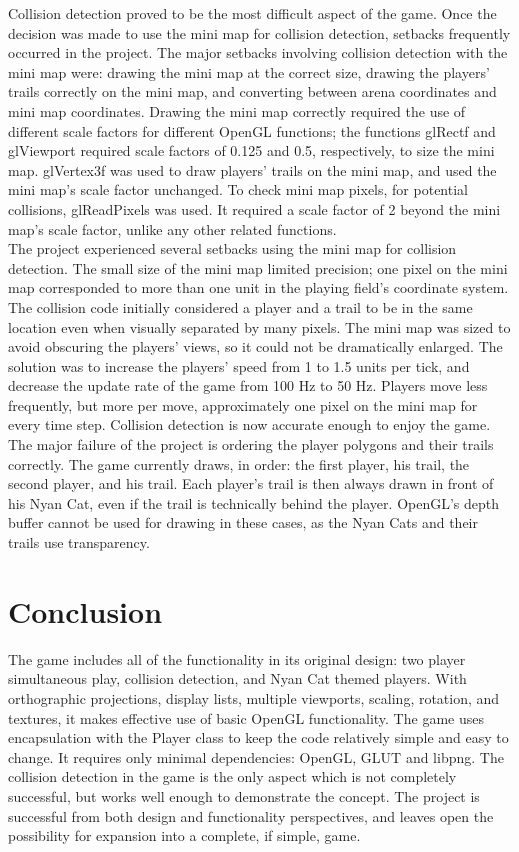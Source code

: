 \documentclass[12pt]{article}
\begin{document}
Collision detection proved to be the most difficult aspect of the game.  Once the decision was made to use the mini map for collision detection, setbacks frequently occurred in the project.  The major setbacks involving collision detection with the mini map were: drawing the mini map at the correct size, drawing the players' trails correctly on the mini map, and converting between arena coordinates and mini map coordinates.  Drawing the mini map correctly required the use of different scale factors for different OpenGL functions; the functions glRectf and glViewport required scale factors of 0.125 and 0.5, respectively, to size the mini map.  glVertex3f was used to draw players' trails on the mini map, and used the mini map's scale factor unchanged.  To check mini map pixels, for potential collisions, glReadPixels was used.  It required a scale factor of 2 beyond the mini map's scale factor, unlike any other related functions.\\

The project experienced several setbacks using the mini map for collision detection.  The small size of the mini map limited precision; one pixel on the mini map corresponded to more than one unit in the playing field's coordinate system. The collision code initially considered a player and a trail to be in the same location even when visually separated by many pixels.  The mini map was sized to avoid obscuring the players' views, so it could not be dramatically enlarged. The solution was to increase the players' speed from 1 to 1.5 units per tick, and decrease the update rate of the game from 100 Hz to 50 Hz. Players move less frequently, but more per move, approximately one pixel on the mini map for every time step.  Collision detection is now accurate enough to enjoy the game.\\

The major failure of the project is ordering the player polygons and their trails correctly.  The game currently draws, in order: the first player, his trail, the second player, and his trail.  Each player's trail is then always drawn in front of his Nyan Cat, even if the trail is technically behind the player.  OpenGL's depth buffer cannot be used for drawing in these cases, as the Nyan Cats and their trails use transparency.  

\section{Conclusion}

The game includes all of the functionality in its original design: two player simultaneous play, collision detection, and Nyan Cat themed players.  With orthographic projections, display lists, multiple viewports, scaling, rotation, and textures, it makes effective use of basic OpenGL functionality.  The game uses encapsulation with the Player class to keep the code relatively simple and easy to change. It requires only minimal dependencies: OpenGL, GLUT and libpng.  The collision detection in the game is the only aspect which is not completely successful, but works well enough to demonstrate the concept. The project is successful from both design and functionality perspectives, and leaves open the possibility for expansion into a complete, if simple, game.
\end{document}
